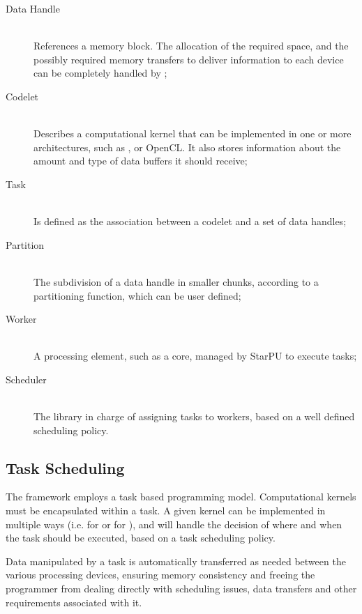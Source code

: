 \documentclass[main.tex]{subfiles}
\begin{document}
\begin{description}
  \item[Data Handle] \hfill \\
    References a memory block. The allocation of the required space, and the possibly required memory transfers to deliver information to each device can be completely handled by \starpu;

  \item[Codelet] \hfill \\
    Describes a computational kernel that can be implemented in one or more architectures, such as \cpus, \cuda or \acs{OpenCL}. It also stores information about the amount and type of data buffers it should receive;

  \item[Task] \hfill \\
    Is defined as the association between a codelet and a set of data handles;

  \item[Partition] \hfill \\
    The subdivision of a data handle in smaller chunks, according to a partitioning function, which can be user defined;

  \item[Worker] \hfill \\
    A processing element, such as a \cpu core, managed by StarPU to execute tasks;

  \item[Scheduler] \hfill \\
    The library in charge of assigning tasks to workers, based on a well defined scheduling policy.

\end{description}

\subsection{Task Scheduling}

The framework employs a task based programming model. Computational kernels must be encapsulated within a task. A given kernel can be implemented in multiple ways (i.e. for \cpus or for \cuda), and \starpu will handle the decision of where and when the task should be executed, based on a task scheduling policy.

Data manipulated by a task is automatically transferred as needed between the various processing devices, ensuring memory consistency and freeing the programmer from dealing directly with scheduling issues, data transfers and other requirements associated with it.
\end{document}
